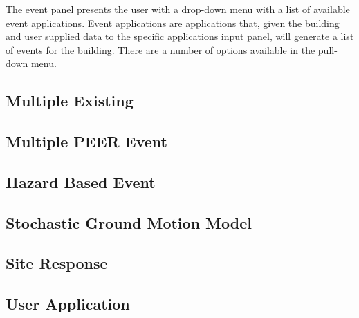 The event panel presents the user with a drop-down menu with a list of
available event applications. Event applications are applications
that, given the building and user supplied data to the specific
applications input panel, will generate a list of events for the
building. There are a number of options available in the pull-down
menu.

\subsection{Multiple Existing}


\subsection{Multiple PEER Event}


\subsection{Hazard Based Event}


\subsection{Stochastic Ground Motion Model}


\subsection{Site Response}


\subsection{User Application}

